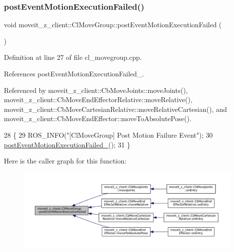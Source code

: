 \subsubsection{\texorpdfstring{post\+Event\+Motion\+Execution\+Failed()}{postEventMotionExecutionFailed()}}
{\footnotesize\ttfamily void moveit\+\_\+z\+\_\+client\+::\+Cl\+Move\+Group\+::post\+Event\+Motion\+Execution\+Failed (\begin{DoxyParamCaption}{ }\end{DoxyParamCaption})}



Definition at line 27 of file cl\+\_\+movegroup.\+cpp.



References post\+Event\+Motion\+Execution\+Failed\+\_\+.



Referenced by moveit\+\_\+z\+\_\+client\+::\+Cb\+Move\+Joints\+::move\+Joints(), moveit\+\_\+z\+\_\+client\+::\+Cb\+Move\+End\+Effector\+Relative\+::move\+Relative(), moveit\+\_\+z\+\_\+client\+::\+Cb\+Move\+Cartesian\+Relative\+::move\+Relative\+Cartesian(), and moveit\+\_\+z\+\_\+client\+::\+Cb\+Move\+End\+Effector\+::move\+To\+Absolute\+Pose().


\begin{DoxyCode}
28 \{
29     ROS\_INFO(\textcolor{stringliteral}{"[ClMoveGroup] Post Motion Failure Event"});
30     \hyperlink{classmoveit__z__client_1_1ClMoveGroup_afecfdc1860dffea3331379b90d608154}{postEventMotionExecutionFailed\_}();
31 \}
\end{DoxyCode}
Here is the caller graph for this function\+:
\nopagebreak
\begin{figure}[H]
\begin{center}
\leavevmode
\includegraphics[width=350pt]{classmoveit__z__client_1_1ClMoveGroup_a42bede73264ae2d5dfe0117315042acb_icgraph}
\end{center}
\end{figure}
\mbox{\label{classmoveit__z__client_1_1ClMoveGroup_ad6b8f0acbe3d11b5c39a83911a3d95b8}} 
